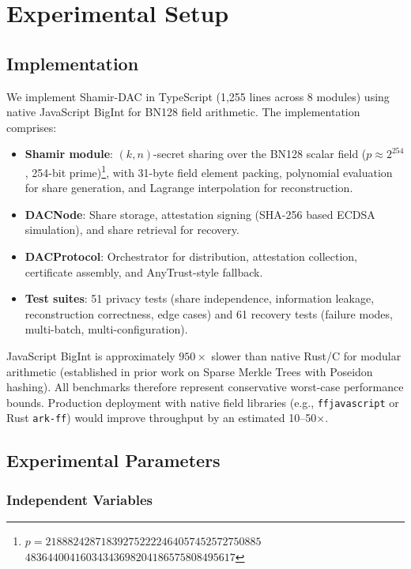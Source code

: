
\section{Experimental Setup}

\subsection{Implementation}

We implement Shamir-DAC in TypeScript (1,255 lines across 8 modules) using
native JavaScript BigInt for BN128 field arithmetic. The implementation
comprises:

\begin{itemize}
\item \textbf{Shamir module}: $(k,n)$-secret sharing over the BN128 scalar
  field ($p \approx 2^{254}$, 254-bit prime)\footnote{%
  $p = 218882428718392752222464057452572750885$\-$48364400416034343698204186575808495617$},
  with 31-byte field element packing, polynomial evaluation for share
  generation, and Lagrange interpolation for reconstruction.
\item \textbf{DACNode}: Share storage, attestation signing (SHA-256 based
  ECDSA simulation), and share retrieval for recovery.
\item \textbf{DACProtocol}: Orchestrator for distribution, attestation
  collection, certificate assembly, and AnyTrust-style fallback.
\item \textbf{Test suites}: 51 privacy tests (share independence,
  information leakage, reconstruction correctness, edge cases) and 61
  recovery tests (failure modes, multi-batch, multi-configuration).
\end{itemize}

JavaScript BigInt is approximately $950\times$ slower than native Rust/C
for modular arithmetic (established in prior work on Sparse Merkle Trees
with Poseidon hashing). All benchmarks therefore represent conservative
worst-case performance bounds. Production deployment with native field
libraries (e.g., \texttt{ffjavascript} or Rust \texttt{ark-ff}) would
improve throughput by an estimated 10--50$\times$.

\subsection{Experimental Parameters}

\subsubsection{Independent Variables}

